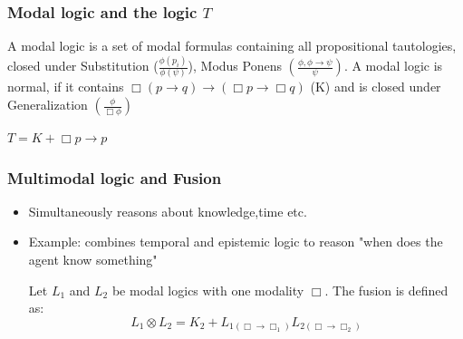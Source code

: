 \documentclass[hyperref={pdfpagelabels=false},t,10pt]{beamer}
\begin{document}
\begin{frame}
  \frametitle{Modal logic and the logic $T$}
  \begin{definition}
    A modal logic is a set of modal formulas containing all propositional tautologies, closed under Substitution ($\frac{\phi(p_i)}{\phi(\psi)}$), Modus Ponens $(\frac{\phi, \phi \rightarrow \psi}{\psi})$. \newline \newline \pause
    A modal logic is normal, if it contains $\Box (p \rightarrow q) \rightarrow (\Box p \rightarrow \Box q)$ (K) and is closed under Generalization $(\frac{\phi}{\Box \phi})$
  \end{definition}

  \begin{definition}
      $T = K + \Box p \rightarrow p$
  \end{definition}
\end{frame}



\begin{frame}
  \frametitle{Multimodal logic and Fusion}
  \begin{itemize}
    \item Simultaneously reasons about knowledge,time etc. 
    \item Example: combines temporal and epistemic logic to reason "when does the agent know something" \pause %
       \begin{definition}
      Let $L_1$ and $L_2$ be modal logics with one modality $\Box$. The fusion is defined as:
      $$ L_1 \otimes L_2 = K_2 + L_{1(\Box \rightarrow \Box_1)} L_{2(\Box \rightarrow \Box_2)} $$    
    \end{definition}

  \end{itemize}
\end{frame}
\end{document}
